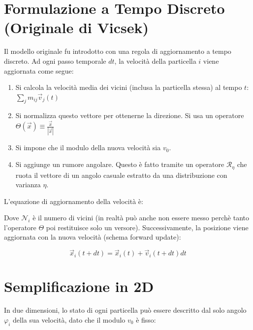 \section{Formulazione a Tempo Discreto (Originale di Vicsek)}
Il modello originale fu introdotto con una regola di aggiornamento a tempo discreto. Ad ogni passo temporale $dt$, la velocità della particella $i$ viene aggiornata come segue:

\begin{enumerate}
    \item Si calcola la velocità media dei vicini (inclusa la particella stessa) al tempo $t$: $\sum_{j} m_{ij}\vec{v}_{j}(t)$
    \item Si normalizza questo vettore per ottenerne la direzione. Si usa un operatore $\mathcal{\Theta}(\vec{x}) \equiv \frac{\vec{x}}{|\vec{x}|}$
    \item Si impone che il modulo della nuova velocità sia $v_0$.
    \item Si aggiunge un rumore angolare. Questo è fatto tramite un operatore $\mathcal{R}_{\eta}$ che ruota il vettore di un angolo casuale estratto da una distribuzione con varianza $\eta$.
\end{enumerate}

L'equazione di aggiornamento della velocità è:

\vspace{0.5cm}
\noindent{}
\vspace{0.5cm}

Dove $\mathcal{N}_i$ è il numero di vicini (in realtà può anche non essere messo perchè tanto l'operatore $\mathcal{\Theta}$ poi restituisce solo un versore).
Successivamente, la posizione viene aggiornata con la nuova velocità (schema forward update):

\begin{equation} \label{eq:ch27_18}
\vec{x}_{i}(t+dt) = \vec{x}_{i}(t) + \vec{v}_{i}(t+dt)dt
\end{equation}


\section{Semplificazione in 2D}
In due dimensioni, lo stato di ogni particella può essere descritto dal solo angolo $\varphi_i$ della sua velocità, dato che il modulo $v_0$ è fisso:


